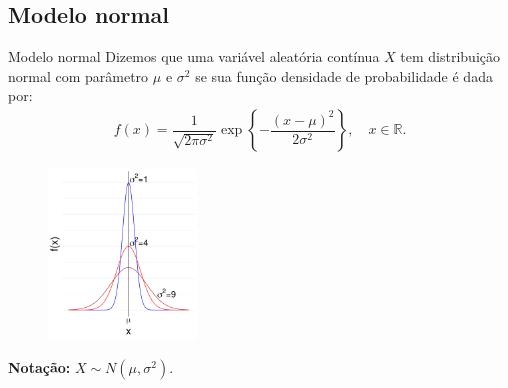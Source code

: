 \documentclass[9pt]{beamer}
\begin{document}
\subsection{Modelo normal}

\begin{frame}{Modelo normal}
Dizemos que uma variável aleatória contínua $X$ tem distribuição normal com parâmetro $\mu$ e $\sigma^2$ se sua função densidade de probabilidade é dada por:
\begin{align*}
 f(x) = \dfrac{1}{\sqrt{2 \pi \sigma^2}} \exp \left\{ -\dfrac{(x-\mu)^2}{2\sigma^2}  \right\}, \quad x \in \mathbb{R}.
\end{align*}

\begin{figure}[ht]
 \centering
 \caption{}
 \includegraphics[height = 4.5cm]{figure/normal.png}
\end{figure}


\textbf{Notação:} $X \sim N(\mu, \sigma^2)$.

\end{frame}
\end{document}
